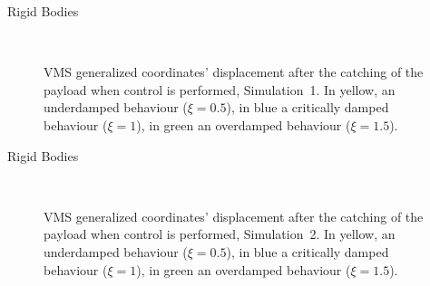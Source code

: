 \begin{frame}{Rigid Bodies}
  \begin{figure}
      \centering
      \subfloat
      {} \quad
    \subfloat
      {} \quad
      \subfloat
      {} \\
      \subfloat
      {} \quad
      \subfloat
      {}
      \caption{VMS generalized coordinates' displacement after the catching of the payload when control is performed, Simulation~1. In yellow, an underdamped behaviour ($\xi=0.5$), in blue a critically damped behaviour ($\xi=1$), in green an overdamped behaviour ($\xi=1.5$).}
    \end{figure}
\end{frame}

\begin{frame}{Rigid Bodies}
  \begin{figure}
      \centering
      \subfloat
      {} \quad
    \subfloat
      {} \quad
      \subfloat
      {} \\
      \subfloat
      {} \quad
      \subfloat
      {}
      \caption{VMS generalized coordinates' displacement after the catching of the payload when control is performed, Simulation~2. In yellow, an underdamped behaviour ($\xi=0.5$), in blue a critically damped behaviour ($\xi=1$), in green an overdamped behaviour ($\xi=1.5$).}
    \end{figure}
\end{frame}

